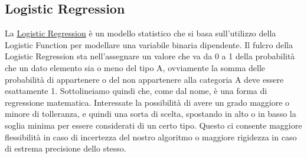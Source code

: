 \subsection{Logistic Regression}
La \href{https://en.wikipedia.org/wiki/Logistic_regression}{Logistic Regression}  è un modello statistico che si basa sull'utilizzo della Logistic Function per modellare una variabile binaria dipendente. Il fulcro della Logistic Regression sta nell'assegnare un valore che va da 0 a 1 della probabilità che un dato elemento sia o meno del tipo A, ovviamente la somma delle probabilità di appartenere o del non appartenere alla categoria A deve essere esattamente 1. Sottolineiamo quindi che, come dal nome, è una forma di regressione matematica. Interessate la possibilità di avere un grado maggiore o minore di tolleranza, e quindi una sorta di scelta, spostando in alto o in basso la soglia minima per essere considerati di un certo tipo. Questo ci consente maggiore flessibilità in caso di incertezza del nostro algoritmo o maggiore rigidezza in caso di estrema precisione dello stesso.